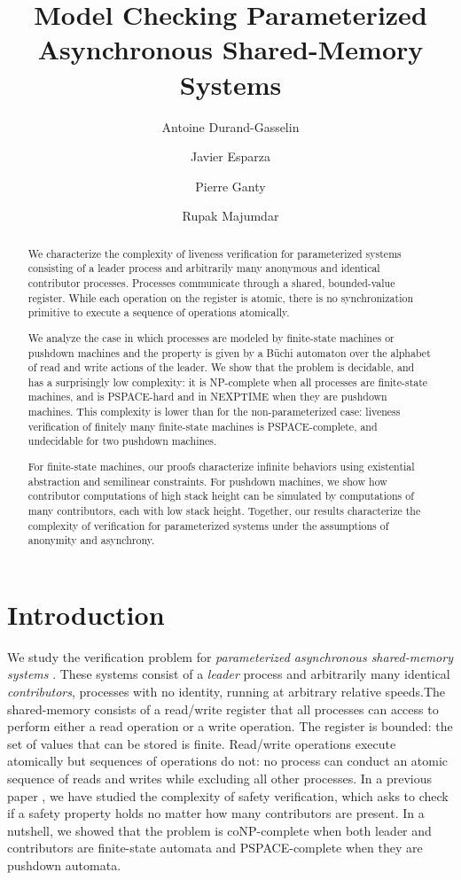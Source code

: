 \documentclass{llncs}
\title{\texorpdfstring{Model Checking Parameterized Asynchronous Shared-Memory Systems}{Model Checking Parameterized Asynchronous Shared-Memory Systems}}
\author{Antoine Durand-Gasselin\inst{1} \and Javier Esparza\inst{1} \and Pierre Ganty\inst{2} \and Rupak Majumdar\inst{3}}
\institute{TU Munich \quad IMDEA Software Institute \quad MPI-SWS}
\begin{document}
\maketitle

\begin{abstract}
\makeatletter{}

We characterize the complexity of liveness verification for
parameterized systems consisting of a leader process and arbitrarily many
anonymous and identical contributor processes.  Processes communicate through a shared,
bounded-value register. While each operation on the register is atomic, there
is no synchronization primitive to execute a sequence of operations atomically.



We analyze the case in which processes are
modeled by finite-state machines or pushdown machines and the property is given
by a B\"uchi automaton over the alphabet of read and write actions of the leader.
We show that the problem is decidable, and has a surprisingly low complexity: 
it is NP-complete when all processes are finite-state machines, and is PSPACE-hard and in NEXPTIME 
when they are pushdown machines. This complexity is lower than for the 
non-parameterized case: liveness verification of finitely many finite-state machines is 
PSPACE-complete, and undecidable for two pushdown machines. 

For finite-state machines, our proofs characterize infinite behaviors using existential abstraction
and semilinear constraints.
For pushdown machines, we show how contributor computations of high stack height can be simulated by computations of
many contributors, each with low stack height. 
Together, our results characterize the complexity of verification 
for parameterized systems under the assumptions of anonymity and asynchrony.


\end{abstract}

\makeatletter{}

\section{Introduction}

We study the verification problem for
\emph{parameterized asynchronous shared-memory systems} \cite{Hague11,egm13}. 
These systems consist of a \emph{leader} process and
arbitrarily many identical \emph{contributors}, processes with no identity, running at
arbitrary relative speeds.The shared-memory consists of a read/write register that all processes can access
to perform either a read operation or a write operation. The register is
bounded: the set of values that can be stored is finite. Read/write operations execute 
atomically but sequences of operations do not: no process can conduct an atomic sequence 
of reads and writes while excluding all other processes. 
In a previous paper \cite{egm13}, we have studied the complexity of safety verification, 
which asks to check if a safety property holds no matter how many contributors are present.
In a nutshell, we showed that the problem is coNP-complete when both leader and contributors
are finite-state automata and PSPACE-complete when they are pushdown automata.
\end{document}
